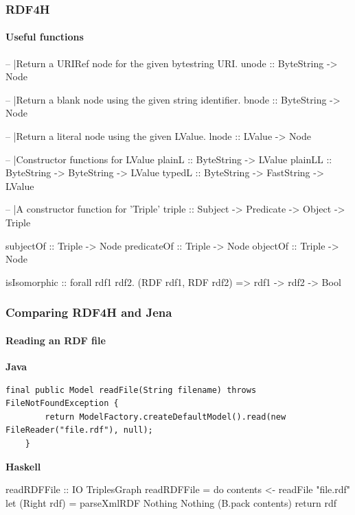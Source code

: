 \documentclass{beamer}
\begin{document}
\begin{frame}[fragile]
\frametitle{RDF4H}
\framesubtitle{Useful functions}

\begin{haskellcode}
-- |Return a URIRef node for the given bytestring URI.
unode :: ByteString -> Node

-- |Return a blank node using the given string identifier.
bnode :: ByteString ->  Node

-- |Return a literal node using the given LValue.
lnode :: LValue ->  Node

-- |Constructor functions for LValue
plainL :: ByteString -> LValue
plainLL :: ByteString -> ByteString -> LValue
typedL :: ByteString -> FastString -> LValue

-- |A constructor function for 'Triple'
triple :: Subject -> Predicate -> Object -> Triple

subjectOf :: Triple -> Node
predicateOf :: Triple -> Node
objectOf :: Triple -> Node

isIsomorphic :: forall rdf1 rdf2. (RDF rdf1, RDF rdf2) => rdf1 -> rdf2 -> Bool

\end{haskellcode}

\end{frame}


\begin{frame}[fragile]
\frametitle{Comparing RDF4H and Jena}
\framesubtitle{Reading an RDF file}


\textbf{Java}

\begin{lstlisting}[style=MyJavaStyle]
final public Model readFile(String filename) throws FileNotFoundException {
        return ModelFactory.createDefaultModel().read(new FileReader("file.rdf"), null);
    }
\end{lstlisting}

\bigskip
\textbf{Haskell}

\begin{haskellcode}
readRDFFile :: IO TriplesGraph
readRDFFile = do
  contents <- readFile "file.rdf"
  let (Right rdf) = parseXmlRDF Nothing Nothing (B.pack contents)
  return rdf
\end{haskellcode}

\end{frame}
\end{document}
